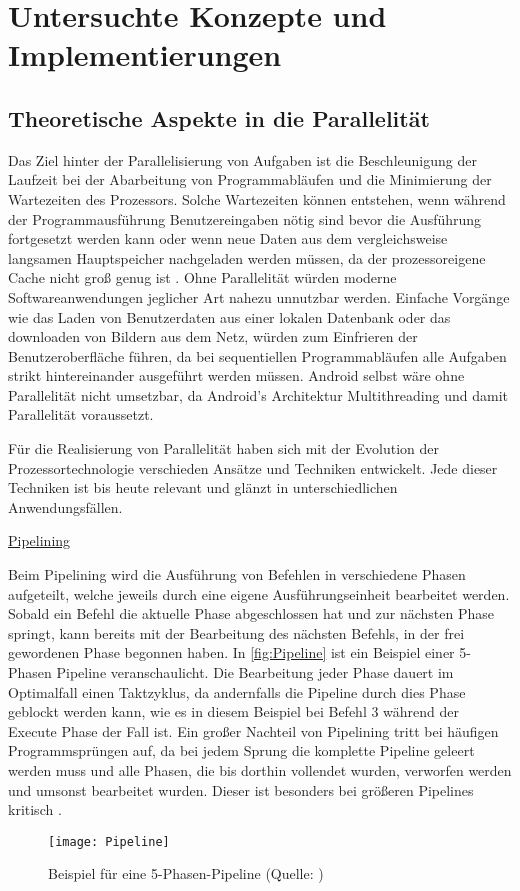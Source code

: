 \chapter{Untersuchte Konzepte und Implementierungen}

\section{Theoretische Aspekte in die Parallelität}
Das Ziel hinter der Parallelisierung von Aufgaben ist die Beschleunigung der Laufzeit bei der Abarbeitung von Programmabläufen und die Minimierung der Wartezeiten des Prozessors. Solche Wartezeiten können entstehen, wenn während der Programmausführung Benutzereingaben nötig sind bevor die Ausführung fortgesetzt werden kann oder wenn neue Daten aus dem vergleichsweise langsamen Hauptspeicher nachgeladen werden müssen, da der prozessoreigene Cache nicht groß genug ist \cite[1135]{wolf2020}. Ohne Parallelität würden moderne Softwareanwendungen jeglicher Art nahezu unnutzbar werden. Einfache Vorgänge wie das Laden von Benutzerdaten aus einer lokalen Datenbank oder das downloaden von Bildern aus dem Netz, würden zum Einfrieren der Benutzeroberfläche führen, da bei sequentiellen Programmabläufen alle Aufgaben strikt hintereinander ausgeführt werden müssen. Android selbst wäre ohne Parallelität nicht umsetzbar, da Android's Architektur Multithreading und damit Parallelität voraussetzt.

Für die Realisierung von Parallelität haben sich mit der Evolution der Prozessortechnologie verschieden Ansätze und Techniken entwickelt. Jede dieser Techniken ist bis heute relevant und glänzt in unterschiedlichen Anwendungsfällen.

\underline{Pipelining}

Beim Pipelining wird die Ausführung von Befehlen in verschiedene Phasen aufgeteilt, welche jeweils durch eine eigene Ausführungseinheit bearbeitet werden. Sobald ein Befehl die aktuelle Phase abgeschlossen hat und zur nächsten Phase springt, kann bereits mit der Bearbeitung des nächsten Befehls, in der frei gewordenen Phase begonnen haben. In \autoref{fig:Pipeline} ist ein Beispiel einer 5-Phasen Pipeline veranschaulicht. Die Bearbeitung jeder Phase dauert im Optimalfall einen Taktzyklus, da andernfalls die Pipeline durch dies Phase geblockt werden kann, wie es in diesem Beispiel bei Befehl 3 während der Execute Phase der Fall ist. Ein großer Nachteil von Pipelining tritt bei häufigen Programmsprüngen auf, da bei jedem Sprung die komplette Pipeline geleert werden muss und alle Phasen, die bis dorthin vollendet wurden, verworfen werden und umsonst bearbeitet wurden. Dieser ist besonders bei größeren Pipelines kritisch \cite{pipelineElektro}.
\begin{figure}[H]
	\begin{center}	 
	\texttt{[image: Pipeline]}
	\caption{Beispiel für eine 5-Phasen-Pipeline (Quelle: \cite{pipelineElektro})}
	\label{fig:Pipeline} 
	\end{center}
\end{figure}


